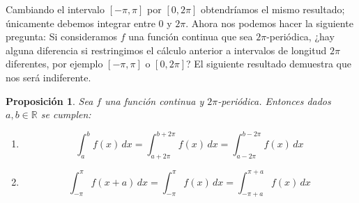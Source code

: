 \documentclass[12pt]{article}
\theoremstyle{plain}
\newtheorem{proposicion}[teorema]{Proposición}
\theoremstyle{definition}
\numberwithin{equation}{section}
\begin{document}
        Cambiando el intervalo \([-\pi,\pi]\) por \([0,2\pi]\) obtendríamos el mismo resultado; únicamente debemos integrar entre 0 y \(2\pi\).
        Ahora nos podemos hacer la siguiente pregunta: Si consideramos \(f\) una función continua que sea \(2\pi\)-periódica, ¿hay alguna diferencia si restringimos el cálculo anterior a intervalos de longitud \(2\pi\) diferentes, por ejemplo \([-\pi,\pi]\) o \([0,2\pi]\)?
        El siguiente resultado demuestra que nos será indiferente.
        \begin{proposicion}
            Sea \(f\) una función continua y \(2\pi\)-periódica. Entonces dados \(a,b \in \mathbb{R}\) se cumplen:
            \begin{enumerate}
                \item $$\int_{a}^{b} f(x) \,dx = \int_{a+2\pi}^{b+2\pi} f(x) \,dx = \int_{a-2\pi}^{b-2\pi} f(x) \,dx$$
                \item $$\int_{-\pi}^{\pi} f(x+a) \,dx = \int_{-\pi}^{\pi} f(x) \,dx = \int_{-\pi+a}^{\pi+a} f(x) \,dx$$
            \end{enumerate}
        \end{proposicion}
\end{document}
